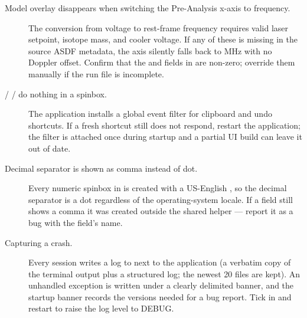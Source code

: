 \begin{description}
    \item[Model overlay disappears when switching the Pre-Analysis
        x-axis to frequency.]
        The conversion from voltage to rest-frame frequency requires
        valid laser setpoint, isotope mass, and cooler voltage. If
        any of these is missing in the source ASDF metadata, the
        axis silently falls back to MHz with no Doppler offset.
        Confirm that the  and 
        fields in  are non-zero; override them
        manually if the run file is incomplete.
    \item[ /  /  do nothing in
        a spinbox.]
        The application installs a global event filter for
        clipboard and undo shortcuts. If a fresh shortcut still does
        not respond, restart the application; the filter is attached
        once during startup and a partial UI build can leave it out
        of date.
    \item[Decimal separator is shown as comma instead of dot.]
        Every numeric spinbox in \denis{} is created with a
        US-English , so the decimal separator is a dot
        regardless of the operating-system locale. If a field still
        shows a comma it was created outside the shared helper ---
        report it as a bug with the field's name.
    \item[Capturing a crash.]
        Every session writes a log to
         next to the application
        (a verbatim copy of the terminal output plus a structured
        log; the newest 20 files are kept). An unhandled exception
        is written under a clearly delimited  banner,
        and the startup banner records the versions needed for a bug
        report. Tick  in
         and
        restart to raise the log level to DEBUG.
\end{description}
